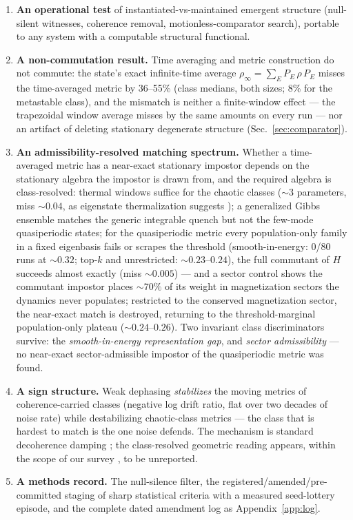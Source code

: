 \documentclass[a4paper,11pt,noarxiv]{quantumarticle}
\begin{document}
\begin{enumerate}
\item \textbf{An operational test} of instantiated-vs-maintained
  emergent structure (null-silent witnesses, coherence removal,
  motionless-comparator search), portable to any system with a
  computable structural functional.
\item \textbf{A non-commutation result.} Time averaging and metric
  construction do not commute: the state's exact infinite-time
  average $\rho_\infty = \sum_E P_E\,\rho\,P_E$ \cite{SRC065} misses
  the time-averaged metric by 36--55\% (class medians, both sizes;
  8\% for the metastable class), and the mismatch is neither a finite-window
  effect --- the trapezoidal window average misses by the same
  amounts on every run --- nor an artifact of deleting stationary
  degenerate structure (Sec.~\ref{sec:comparator}).
\item \textbf{An admissibility-resolved matching spectrum.} Whether a
  time-averaged metric has a near-exact stationary impostor depends on
  the stationary algebra the impostor is drawn from, and the required
  algebra is class-resolved: thermal windows suffice for the chaotic
  classes ($\sim$3 parameters, miss $\sim 0.04$, as eigenstate
  thermalization suggests \cite{SRC066}); a generalized Gibbs
  ensemble \cite{SRC065,SRC067} matches the generic integrable quench
  but not the few-mode quasiperiodic states; for the quasiperiodic
  metric every population-only family in a fixed eigenbasis fails or
  scrapes the threshold (smooth-in-energy: 0/80 runs at $\sim 0.32$;
  top-$k$ and unrestricted: $\sim 0.23$--$0.24$), the full commutant
  of $H$ succeeds almost exactly (miss $\sim 0.005$) --- and a sector
  control shows the commutant impostor places $\sim\!70\%$ of its
  weight in magnetization sectors the dynamics never populates;
  restricted to the conserved magnetization sector, the near-exact
  match is destroyed, returning to the threshold-marginal
  population-only plateau ($\sim 0.24$--$0.26$). Two invariant class
  discriminators survive: the \emph{smooth-in-energy representation
  gap}, and \emph{sector admissibility} --- no near-exact
  sector-admissible impostor of the quasiperiodic metric was found.
\item \textbf{A sign structure.} Weak dephasing \emph{stabilizes} the
  moving metrics of coherence-carried classes (negative log drift
  ratio, flat over two decades of noise rate) while destabilizing
  chaotic-class metrics --- the class that is hardest to match is the
  one noise defends. The mechanism is standard decoherence damping
  \cite{SRC059}; the class-resolved geometric reading appears, within
  the scope of our survey \cite{SRC060,SRC061,SRC062,SRC063}, to be
  unreported.
\item \textbf{A methods record.} The null-silence filter, the
  registered/amended/pre-committed staging of sharp statistical
  criteria with a measured seed-lottery episode, and the complete
  dated amendment log as Appendix~\ref{app:log}.
\end{enumerate}
\end{document}
